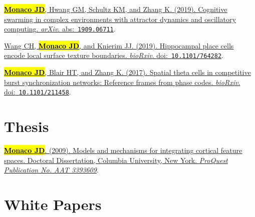 \documentclass[10pt]{article}
\newcommand{\itemtitle}[1]{{\color{hopkinsblue}\ul{#1}}}
\newcommand{\joehl}[1]{\hl{\textbf{#1}}}
\newcommand{\doi}[1]{{\color{darkgray}doi:}~{\color{dimgray}\texttt{#1}}}
\newcommand{\abs}[1]{{\color{darkgray}abs:}~{\color{dimgray}\texttt{#1}}}
\begin{document}
\begin{description}
  \item \href{https://arxiv.org/abs/1909.06711}
    {\joehl{Monaco JD}, Hwang GM, Schultz KM, and Zhang K. (2019).
    \itemtitle{Cognitive swarming in complex environments with attractor
    dynamics and oscillatory computing}. \emph{arXiv}. \abs{1909.06711}}.
  \item \href{http://doi.org/10.1101/764282}
    {Wang CH, \joehl{Monaco JD}, and Knierim JJ. (2019). \itemtitle{Hippocampal
      place cells encode local surface texture boundaries}. \emph{bioRxiv}.
    \doi{10.1101/764282}}.
  \item \href{http://dx.doi.org/10.1101/211458}
    {\joehl{Monaco JD}, Blair HT, and Zhang K. (2017). \itemtitle{Spatial theta
        cells in competitive burst synchronization networks: Reference frames from
    phase codes}. \emph{bioRxiv}. \doi{10.1101/211458}}.
\end{description}

\section*{Thesis}

\begin{description}
  \item \href{http://search.proquest.com/docview/304862872/abstract}
    {\joehl{Monaco JD}. (2009). \itemtitle{Models and mechanisms for integrating
      cortical feature spaces}. Doctoral Dissertation, Columbia University, New
    York. \emph{ProQuest Publication No. AAT 3393609}}.
\end{description}

\section*{White Papers} \label{sec:whitepapers}
\end{document}
